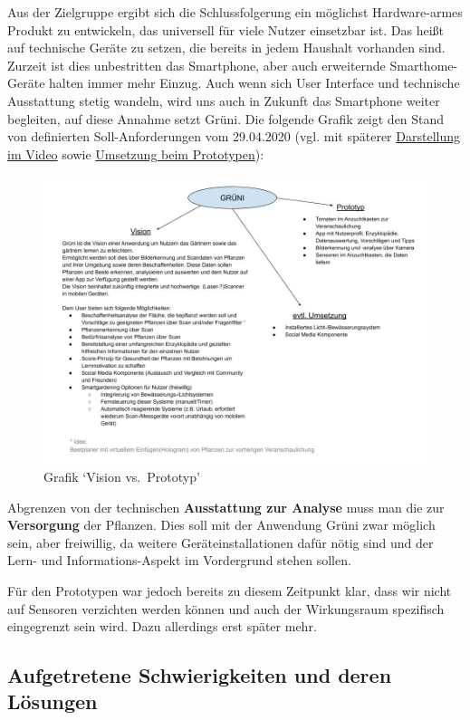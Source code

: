 Aus der Zielgruppe ergibt sich die Schlussfolgerung ein möglichst
Hardware-armes Produkt zu entwickeln, das universell für viele Nutzer
einsetzbar ist. Das heißt auf technische Geräte zu setzen, die bereits
in jedem Haushalt vorhanden sind. Zurzeit ist dies unbestritten das
Smartphone, aber auch erweiternde Smarthome-Geräte halten immer mehr
Einzug. Auch wenn sich User Interface und technische Ausstattung stetig
wandeln, wird uns auch in Zukunft das Smartphone weiter begleiten, auf
diese Annahme setzt Grüni. Die folgende Grafik zeigt den Stand von
definierten Soll-Anforderungen vom 29.04.2020 (vgl. mit späterer
\protect\hyperlink{ux5cux23ux5cux23Interaktionsgestaltung}{Darstellung
im Video} sowie \protect\hyperlink{ux5cux23Umsetzung}{Umsetzung beim
Prototypen}):

\begin{figure}
\centering
\includegraphics{img/Projektthema.jpg}
\caption{Grafik `Vision vs.~Prototyp'}
\end{figure}

Abgrenzen von der technischen \textbf{Ausstattung zur Analyse} muss man
die zur \textbf{Versorgung} der Pflanzen. Dies soll mit der Anwendung
Grüni zwar möglich sein, aber freiwillig, da weitere
Geräteinstallationen dafür nötig sind und der Lern- und
Informations-Aspekt im Vordergrund stehen sollen.

Für den Prototypen war jedoch bereits zu diesem Zeitpunkt klar, dass wir
nicht auf Sensoren verzichten werden können und auch der Wirkungsraum
spezifisch eingegrenzt sein wird. Dazu allerdings erst später mehr.

\hypertarget{aufgetretene-schwierigkeiten-und-deren-luxf6sungen}{%
\subsection{Aufgetretene Schwierigkeiten und deren
Lösungen}\label{aufgetretene-schwierigkeiten-und-deren-luxf6sungen}}

